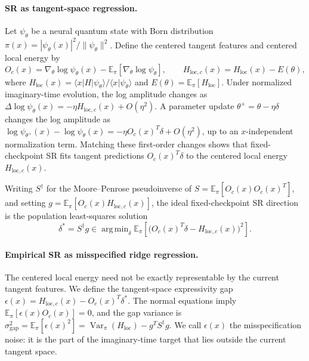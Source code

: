 \documentclass{article}
\DeclareMathOperator*{\argmin}{arg\,min}
\newcommand{\Expect}{\mathbb{E}}
\begin{document}
\paragraph{SR as tangent-space regression.}
Let $\psi_\theta$ be a neural quantum state with Born distribution
\(\pi(x)=|\psi_\theta(x)|^2/\|\psi_\theta\|^2\). Define the centered tangent
features and centered local energy by
\[
    O_c(x)=\nabla_\theta\log\psi_\theta(x)
    -\Expect_\pi[\nabla_\theta\log\psi_\theta],
    \qquad
    H_{\mathrm{loc},c}(x)=H_{\mathrm{loc}}(x)-E(\theta),
\]
where \(H_{\mathrm{loc}}(x)=\langle x|H|\psi_\theta\rangle/
\langle x|\psi_\theta\rangle\) and
\(E(\theta)=\Expect_\pi[H_{\mathrm{loc}}]\). Under normalized imaginary-time
evolution, the log amplitude changes as
\(\Delta\log\psi_\theta(x)=-\eta H_{\mathrm{loc},c}(x)+O(\eta^2)\). A parameter
update \(\theta^+=\theta-\eta\delta\) changes the log amplitude as
\(\log\psi_{\theta^+}(x)-\log\psi_\theta(x)
=-\eta O_c(x)^T\delta+O(\eta^2)\), up to an \(x\)-independent normalization
term. Matching these first-order changes shows that fixed-checkpoint SR fits
tangent predictions \(O_c(x)^T\delta\) to the centered local energy \(H_{\mathrm{loc},c}(x)\).

Writing \(S^\dagger\) for the Moore--Penrose pseudoinverse of
\(S=\Expect_\pi[O_c(x)O_c(x)^T]\), and setting
\(g=\Expect_\pi[O_c(x)H_{\mathrm{loc},c}(x)]\), the ideal fixed-checkpoint SR
direction is the population least-squares solution
\begin{equation}
\label{eq:population_sr_regression}
    \delta^*
    =
    S^\dagger g
    \in
    \argmin_\delta
    \Expect_\pi\!\left[
        \bigl(O_c(x)^T\delta-H_{\mathrm{loc},c}(x)\bigr)^2
    \right].
\end{equation}

\paragraph{Empirical SR as misspecified ridge regression.}
The centered local energy need not be exactly representable by the current
tangent features. We define the tangent-space expressivity gap
$
    \epsilon(x)
    =
    H_{\mathrm{loc},c}(x)-O_c(x)^T\delta^* .
$
The normal equations imply \(\Expect_\pi[\epsilon(x)O_c(x)]=0\), and the gap
variance is
$
    \sigma_{\mathrm{gap}}^2
    =
    \Expect_\pi[\epsilon(x)^2]
    =
    \operatorname{Var}_\pi(H_{\mathrm{loc}})
    -
    g^T S^\dagger g .
$
We call \(\epsilon(x)\) the misspecification noise: it is the part of the
imaginary-time target that lies outside the current tangent space.
\end{document}
